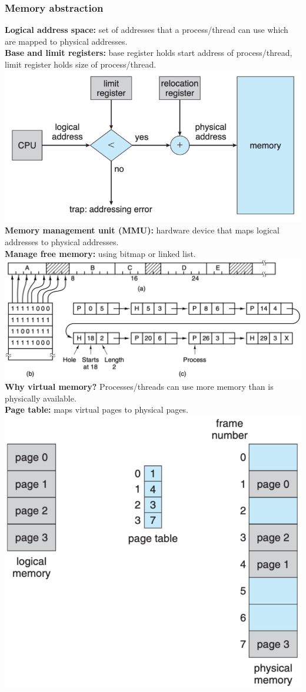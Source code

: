 \subsubsection{Memory abstraction}
\textbf{Logical address space:} set of addresses that a process/thread can use which are mapped to physical addresses.\\
\textbf{Base and limit registers:} base register holds start address of process/thread, limit register holds size of process/thread.\\
\includegraphics[width=\linewidth]{figs/base-and-limit-registers.png}
\textbf{Memory management unit (MMU):} hardware device that maps logical addresses to physical addresses.\\
\textbf{Manage free memory:} using bitmap or linked list.\\
\includegraphics[width=\linewidth]{figs/memory-management.png}
\textbf{Why virtual memory?} Processes/threads can use more memory than is physically available.\\
\textbf{Page table:} maps virtual pages to physical pages.\\
\includegraphics[width=0.4\linewidth]{figs/paging-model.png}
